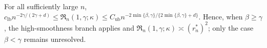 For all sufficiently large \(n\), \(c_{\mathrm{lb}}n^{-2\gamma/(2\gamma+d)}\le\mathfrak R_n(1,\gamma;\kappa)\le C_{\mathrm{ub}}n^{-2\min\{\beta,\gamma\}/\{2\min\{\beta,\gamma\}+d\}}\). Hence, when \(\beta\ge\gamma\), the high-smoothness branch applies and \(\mathfrak R_n(1,\gamma;\kappa)\asymp(r_n^*)^2\); only the case \(\beta<\gamma\) remains unresolved.